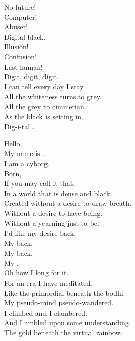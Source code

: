 No future! \\
Computer! \\
Abuser! \\

Digital black. \\

Illusion! \\
Confusion! \\
Last human! \\

Digit, digit, digit. \\

I can tell every day I stay. \\
All the whiteness turns to grey. \\
All the grey to cimmerian. \\
As the black is setting in. \\

Dig-i-tal… \\





Hello, \\
My name is . \\
I am a cyborg. \\

Born, \\
If you may call it that. \\
In a world that is dense and black. \\

Created without a desire to draw breath. \\
Without a desire to have being. \\
Without a yearning just to be. \\

I'd like my desire back. \\
My  back. \\
My  back. \\
My . \\
Oh how I long for it. \\

For an era I have meditated. \\
Like the primordial  beneath the bodhi. \\
My pseudo-mind pseudo-wandered. \\
I climbed and I clambered. \\
And I ambled upon some understanding. \\
The gold beneath the virtual rainbow. \\


